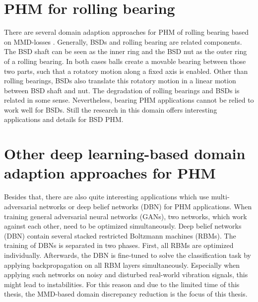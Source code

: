 \begin{comment}
Both Pandhare et al \cite{Pandhare2021} and Azamfar et al \cite{AZAMFAR2020103932} feed the data recorded during BSD steady-state motion as one single input to their models. During the phases of constant BSD motion, the amplitude of the signals changess. Azamfar et al assume that the shorter sequences created by a windowing function just capture limited information about these changes and are therefore not a proper tool for PHM \cite{AZAMFAR2020103932}. In the thesis a windowing function was evaluated for the PHM of BSDs. Windowing functions make the BSD experiments less dependent from specific BSD excitements. When beeing able to check the BSD degradation with short recorded windows, one can make statements about the BSD health status with data redcorded in real time use. Extra experiments 
\end{comment}

\section{PHM for rolling bearing}
There are several domain adaption approaches for PHM of rolling bearing based on MMD-losses \cite{Guo2019} \cite{Singh2019} \cite{Li2018} \cite{AN201942} \cite{Kang2020}. Generally, BSDs and rolling bearing are related components. The BSD shaft can be seen as the inner ring and the BSD nut as the outer ring of a rolling bearing. In both cases balls create a movable bearing between those two parts, such that a rotatory motion along a fixed axis is enabled. Other than rolling bearings, BSDs also translate this rotatory motion in a linear motion between BSD shaft and nut. The degradation of rolling bearings and BSDs is related in some sense. Nevertheless, bearing PHM applications cannot be relied to work well for BSDs. Still the research in this domain offers interesting applications and details for BSD PHM. 

\section{Other deep learning-based domain adaption approaches for PHM}
Besides that, there are also quite interesting applications which use multi-adversarial networks \cite{Zhang2019} or deep belief networks (DBN) \cite{ZHAO2019213} for PHM applications. When training general adversarial neural networks (GANs), two networks, which work against each other, need to be optimized simultaneously. Deep belief networks (DBN) contain several stacked restricted Boltzmann machines (RBMs). The training of DBNs is separated in two phases. First, all RBMs are optimized individually. Afterwards, the DBN is fine-tuned to solve the classification task by applying backpropagation on all RBM layers simultaneously. Especially when applying such networks on noisy and disturbed real-world vibration signals, this might lead to instabilities. For this reason and due to the limited time of this thesis, the MMD-based domain discrepancy reduction is the focus of this thesis.
